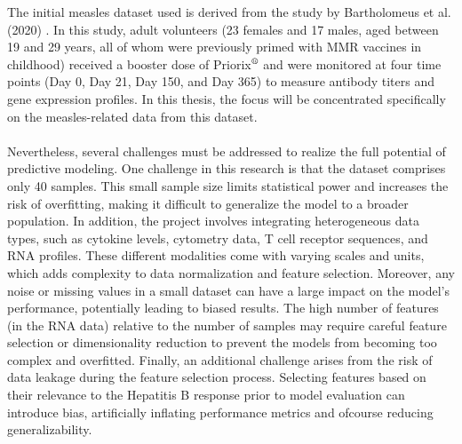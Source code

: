 \documentclass[12pt,a4paper]{report}
\newcommand{\remark}[1]{%
  \par\noindent%
  \begin{tcolorbox}[ colback=orange!20!white, colframe=orange!80!black, boxrule=0.5pt, sharp corners, width=\linewidth, ]
    {\textbf{\textcolor{orange!80!black}!REMARK:}}~#1
  \end{tcolorbox}%
}
\begin{document}
\noindent
The initial measles dataset used is derived from the study by Bartholomeus et al. (2020) \cite{bartholomeus2020transcriptomic}.
In this study, adult volunteers (23 females and 17 males, aged between 19 and 29 years, all of whom were previously primed with MMR vaccines in childhood) received a booster dose of Priorix$^{\mbox{\scriptsize\textregistered}}$ and were monitored at four time points (Day 0, Day 21, Day 150, and Day 365) to measure antibody titers and gene expression profiles. In this thesis, the focus will be concentrated specifically on the measles-related data from this dataset. \\
\\
Nevertheless, several challenges must be addressed to realize the full potential of predictive modeling. One challenge in this research is that the dataset comprises only 40 samples. This small sample size limits statistical power and increases the risk of overfitting, making it difficult to generalize the model to a broader population. In addition, the project involves integrating heterogeneous data types, such as cytokine levels, cytometry data, T cell receptor sequences, and RNA profiles. These different modalities come with varying scales and units, which adds complexity to data normalization and feature selection. Moreover, any noise or missing values in a small dataset can have a large impact on the model’s performance, potentially leading to biased results. The high number of features (in the RNA data) relative to the number of samples may require careful feature selection or dimensionality reduction to prevent the models from becoming too complex and overfitted. Finally, an additional challenge arises from the risk of data leakage during the feature selection process. Selecting features based on their relevance to the Hepatitis B response prior to model evaluation can introduce bias, artificially inflating performance metrics and ofcourse reducing generalizability.
\end{document}
